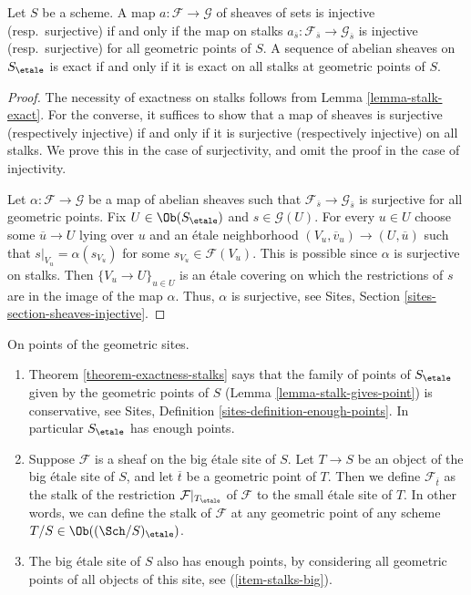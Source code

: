 \begin{theorem}
\label{theorem-exactness-stalks}
Let $S$ be a scheme.
A map $a : \mathcal{F} \to \mathcal{G}$ of sheaves of sets is injective
(resp.\ surjective) if and only if the map on stalks
$a_{\overline{s}} : \mathcal{F}_{\overline{s}} \to \mathcal{G}_{\overline{s}}$
is injective (resp.\ surjective) for all geometric points of $S$.
A sequence of abelian sheaves on $S_\etale$ is exact
if and only if it is exact on all stalks at geometric points of $S$.
\end{theorem}

\begin{proof}
The necessity of exactness on stalks follows from
Lemma \ref{lemma-stalk-exact}.
For the converse, it suffices to show that a map of sheaves is surjective
(respectively injective) if and only if it is surjective (respectively
injective) on all stalks. We prove this in the case of surjectivity, and omit
the proof in the case of injectivity.

\medskip\noindent
Let $\alpha : \mathcal{F} \to \mathcal{G}$ be a map of abelian sheaves such
that $\mathcal{F}_{\overline{s}} \to \mathcal{G}_{\overline{s}}$
is surjective for all geometric points. Fix
$U \in \Ob(S_\etale)$
and $s \in \mathcal{G}(U)$. For every $u \in U$ choose some
$\overline{u} \to U$ lying over $u$ and an \'etale neighborhood
$(V_u , \overline{v}_u) \to (U, \overline{u})$ such that
$s|_{V_u} = \alpha(s_{V_u})$ for some
$s_{V_u} \in \mathcal{F}(V_u)$.
This is possible since $\alpha$ is surjective on
stalks. Then $\{V_u \to U\}_{u \in U}$
is an \'etale covering on which the restrictions of $s$
are in the image of the map $\alpha$.
Thus, $\alpha$ is surjective, see
Sites, Section \ref{sites-section-sheaves-injective}.
\end{proof}

\begin{remarks}
\label{remarks-enough-points}
On points of the geometric sites.
\begin{enumerate}
\item Theorem \ref{theorem-exactness-stalks} says that the family of points
of $S_\etale$ given by the geometric points of $S$
(Lemma \ref{lemma-stalk-gives-point}) is conservative, see
Sites, Definition \ref{sites-definition-enough-points}.
In particular $S_\etale$ has enough points.
\item Suppose $\mathcal{F}$ is a sheaf on the big \'etale site
\label{item-stalks-big}
of $S$. Let $T \to S$ be an object of the big \'etale site of $S$,
and let $\overline{t}$ be a geometric point of $T$. Then we define
$\mathcal{F}_{\overline{t}}$ as the stalk
of the restriction $\mathcal{F}|_{T_\etale}$ of $\mathcal{F}$
to the small \'etale site of $T$. In other words, we can define
the stalk of $\mathcal{F}$ at any geometric point of any
scheme $T/S \in \Ob((\Sch/S)_\etale)$.
\item The big \'etale site of $S$ also has enough points, by
considering all geometric points of all objects of this site, see
(\ref{item-stalks-big}).
\end{enumerate}
\end{remarks}

